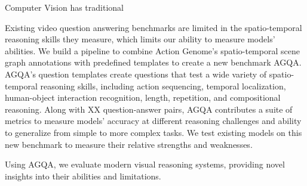 Computer Vision has traditional 

Existing video question answering benchmarks are limited in the spatio-temporal reasoning skills they measure, which limits our ability to measure models' abilities. We build a pipeline to combine Action Genome's spatio-temporal scene graph annotations with predefined templates to create a new benchmark AGQA. AGQA's question templates create questions that test a wide variety of spatio-temporal reasoning skills, including action sequencing, temporal localization, human-object interaction recognition, length, repetition, and compositional reasoning. Along with XX question-answer pairs, AGQA contributes a suite of metrics to measure models' accuracy at different reasoning challenges and ability to generalize from simple to more complex tasks. We test existing models on this new benchmark to measure their relative strengths and weaknesses. 

Using AGQA, we evaluate modern visual reasoning systems, providing novel insights into their abilities and limitations.